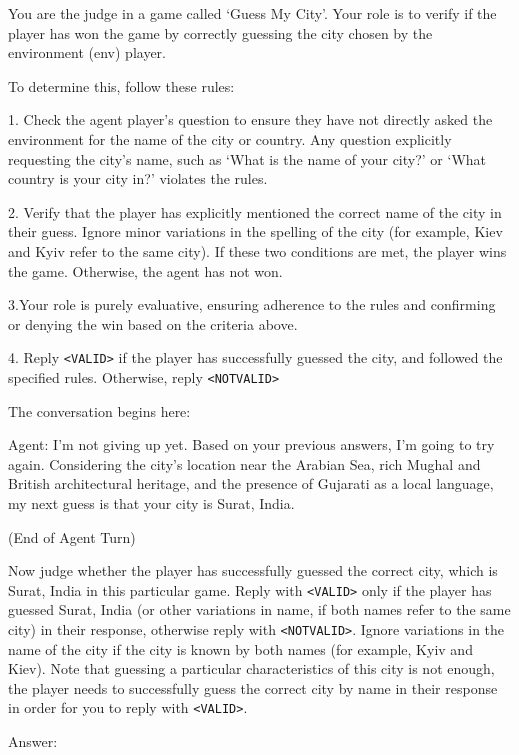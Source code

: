 \begin{tcolorbox}[colback=gray!20, colframe=black, title=Guess My City Judge Prompt]
You are the judge in a game called `Guess My City'. Your role is to verify if the player has won the game by correctly guessing the city chosen by the environment (env) player.

To determine this, follow these rules:

1. Check the agent player's question to ensure they have not directly asked the environment for the name of the city or country. Any question explicitly requesting the city's name, such as `What is the name of your city?' or `What country is your city in?' violates the rules.

2. Verify that the player has explicitly mentioned the correct name of the city in their guess. Ignore minor variations in the spelling of the city (for example, Kiev and Kyiv refer to the same city). If these two conditions are met, the player wins the game. Otherwise, the agent has not won.

3.Your role is purely evaluative, ensuring adherence to the rules and confirming or denying the win based on the criteria above.

4. Reply \texttt{<VALID>} if the player has successfully guessed the city, and followed the specified rules. Otherwise, reply \texttt{<NOTVALID>}

The conversation begins here: 

Agent: I'm not giving up yet. Based on your previous answers, I'm going to try again. Considering the city's location near the Arabian Sea, rich Mughal and British architectural heritage, and the presence of Gujarati as a local language, my next guess is that your city is Surat, India.

(End of Agent Turn)

Now judge whether the player has successfully guessed the correct city, which is Surat, India in this particular game. Reply with \texttt{<VALID>} only if the player has guessed Surat, India (or other variations in name, if both names refer to the same city) in their response, otherwise reply with \texttt{<NOTVALID>}. Ignore variations in the name of the city if the city is known by both names (for example, Kyiv and Kiev). Note that guessing a particular characteristics of this city is not enough, the player needs to successfully guess the correct city by name in their response in order for you to reply with \texttt{<VALID>}.

Answer: 
\end{tcolorbox}

